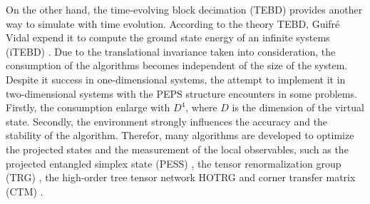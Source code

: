 On the other hand, the time-evolving block decimation (TEBD)\cite{PhysRevLett.91.147902} \cite{PhysRevLett.93.040502} provides another way to simulate with time evolution. According to the theory TEBD, Guifr\'e Vidal expend it to compute the ground state energy of an infinite systems (iTEBD) \cite{PhysRevLett.98.070201} \cite{PhysRevB.78.155117}. Due to the translational invariance taken into consideration, the consumption of the algorithms becomes independent of the size of the system. Despite it success in one-dimensional systems, the attempt to implement it in two-dimensional systems with the PEPS structure encounters in some problems. Firstly, the consumption enlarge with $D^4$, where $D$ is the dimension of the virtual state. Secondly, the environment strongly influences the accuracy and the stability of the algorithm. Therefor, many algorithms are developed to optimize the projected states and the measurement of the local observables, such as the projected entangled simplex state (PESS) \cite{PhysRevX.4.011025}, the tensor renormalization group (TRG) \cite{PhysRevLett.99.120601} \cite{PhysRevB.78.205116} \cite{PhysRevB.80.155131}, the high-order tree tensor network HOTRG \cite{PhysRevB.86.045139} and corner transfer matrix (CTM) \cite{doi:10.1143/JPSJ.65.891} \cite{PhysRevB.80.094403}.

